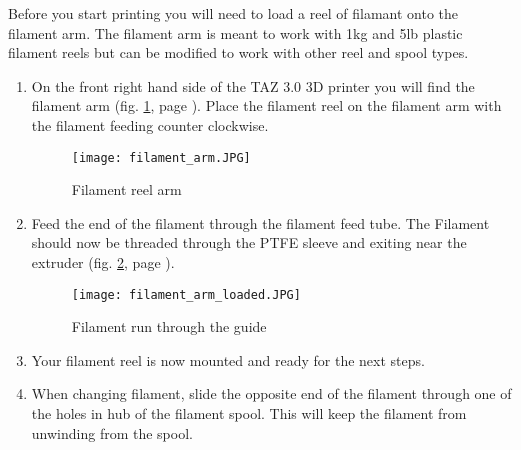 
Before you start printing you will need to load a reel of filamant onto the filament arm. The filament arm is meant to work with 1kg and 5lb plastic filament reels but can be modified to work with other reel and spool types. 

\begin{enumerate}

\item On the front right hand side of the TAZ 3.0 3D printer you will find the filament arm (fig. \ref{fig:filament_arm}, page \pageref{fig:filament_arm}). Place the filament reel on the filament arm with the filament feeding counter clockwise.

\begin{figure}[H]
\centering
\texttt{[image: filament\_arm.JPG]}
\caption{Filament reel arm}
\label{fig:filament_arm}
\end{figure}

\item Feed the end of the filament through the filament feed tube. The Filament should now be threaded through the PTFE sleeve and exiting near the extruder (fig. \ref{fig:filament_arm_loaded}, page \pageref{fig:filament_arm_loaded}).

\begin{figure}[H]
\centering
\texttt{[image: filament\_arm\_loaded.JPG]}
\caption{Filament run through the guide}
\label{fig:filament_arm_loaded}
\end{figure}

\item Your filament reel is now mounted and ready for the next steps.

\item When changing filament, slide the opposite end of the filament through one of the holes in hub of the filament spool. This will keep the filament from unwinding from the spool.

\end{enumerate}


